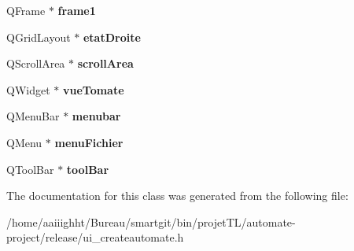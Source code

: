 \begin{DoxyCompactItemize}
\item 
\hypertarget{class_ui___create_automate_a68845d4a61e834e4b51ffdc0e4ba8ab6}{Q\-Frame $\ast$ {\bfseries frame1}}\label{class_ui___create_automate_a68845d4a61e834e4b51ffdc0e4ba8ab6}

\item 
\hypertarget{class_ui___create_automate_aff0664645be47986e5128f611ca67a89}{Q\-Grid\-Layout $\ast$ {\bfseries etat\-Droite}}\label{class_ui___create_automate_aff0664645be47986e5128f611ca67a89}

\item 
\hypertarget{class_ui___create_automate_a9824a119b2e2315f3431a8b2c8337f54}{Q\-Scroll\-Area $\ast$ {\bfseries scroll\-Area}}\label{class_ui___create_automate_a9824a119b2e2315f3431a8b2c8337f54}

\item 
\hypertarget{class_ui___create_automate_ac3a7890ea85d2b00cdca5284f03b752f}{Q\-Widget $\ast$ {\bfseries vue\-Tomate}}\label{class_ui___create_automate_ac3a7890ea85d2b00cdca5284f03b752f}

\item 
\hypertarget{class_ui___create_automate_a3fb88252da2468a423f9aee6b6244b6e}{Q\-Menu\-Bar $\ast$ {\bfseries menubar}}\label{class_ui___create_automate_a3fb88252da2468a423f9aee6b6244b6e}

\item 
\hypertarget{class_ui___create_automate_a391b79cdd9d7a9bd1e651c7efab7008f}{Q\-Menu $\ast$ {\bfseries menu\-Fichier}}\label{class_ui___create_automate_a391b79cdd9d7a9bd1e651c7efab7008f}

\item 
\hypertarget{class_ui___create_automate_a3067b908d77652d76719d3784443505e}{Q\-Tool\-Bar $\ast$ {\bfseries tool\-Bar}}\label{class_ui___create_automate_a3067b908d77652d76719d3784443505e}

\end{DoxyCompactItemize}


The documentation for this class was generated from the following file\-:\begin{DoxyCompactItemize}
\item 
/home/aaiiighht/\-Bureau/smartgit/bin/projet\-T\-L/automate-\/project/release/ui\-\_\-createautomate.\-h\end{DoxyCompactItemize}
